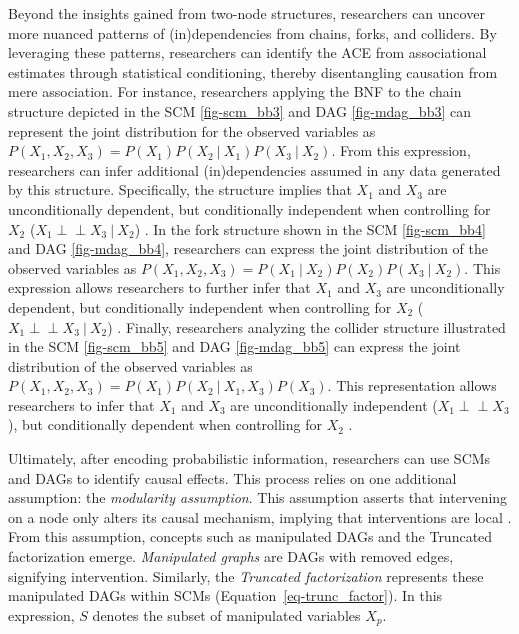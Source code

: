 \documentclass[
  authoryear,
  review,
  1p]{elsarticle}
\begin{document}
Beyond the insights gained from two-node structures, researchers can
uncover more nuanced patterns of (in)dependencies from chains, forks,
and colliders. By leveraging these patterns, researchers can identify
the ACE from associational estimates through statistical conditioning,
thereby disentangling causation from mere association. For instance,
researchers applying the BNF to the chain structure depicted in the SCM
\ref{fig-scm_bb3} and DAG \ref{fig-mdag_bb3} can represent the joint
distribution for the observed variables as
\(P(X_{1},X_{2},X_{3}) = P(X_{1}) P(X_{2} \: | \: X_{1}) P(X_{3} \: | \: X_{2})\).
From this expression, researchers can infer additional (in)dependencies
assumed in any data generated by this structure. Specifically, the
structure implies that \(X_{1}\) and \(X_{3}\) are unconditionally
dependent, but conditionally independent when controlling for \(X_{2}\)
(\(X_{1} \perp\!\!\!\perp X_{3} \: | \: X_{2}\))
\citetext{\citealp[pp.~37]{Pearl_et_al_2016}; \citealp[pp.~25]{Neal_2020}}.
In the fork structure shown in the SCM \ref{fig-scm_bb4} and DAG
\ref{fig-mdag_bb4}, researchers can express the joint distribution of
the observed variables as
\(P(X_{1},X_{2},X_{3}) = P(X_{1} \: | \: X_{2}) P(X_{2}) P(X_{3} \: | \: X_{2})\).
This expression allows researchers to further infer that \(X_{1}\) and
\(X_{3}\) are unconditionally dependent, but conditionally independent
when controlling for \(X_{2}\)
(\(X_{1} \perp\!\!\!\perp X_{3}  \: | \: X_{2}\))
\citep[pp.~40]{Pearl_et_al_2016}. Finally, researchers analyzing the
collider structure illustrated in the SCM \ref{fig-scm_bb5} and DAG
\ref{fig-mdag_bb5} can express the joint distribution of the observed
variables as
\(P(X_{1},X_{2},X_{3}) = P(X_{1}) P(X_{2} \: | \: X_{1}, X_{3}) P(X_{3})\).
This representation allows researchers to infer that \(X_{1}\) and
\(X_{3}\) are unconditionally independent
(\(X_{1} \perp\!\!\!\perp X_{3}\)), but conditionally dependent when
controlling for \(X_{2}\)
\citetext{\citealp[pp.~41]{Pearl_et_al_2016}; \citealp[pp.~26]{Neal_2020}}.

Ultimately, after encoding probabilistic information, researchers can
use SCMs and DAGs to identify causal effects. This process relies on one
additional assumption: the \emph{modularity assumption}. This assumption
asserts that intervening on a node only alters its causal mechanism,
implying that interventions are local \citep[pp.~34]{Neal_2020}. From
this assumption, concepts such as manipulated DAGs and the Truncated
factorization emerge. \emph{Manipulated graphs} are DAGs with removed
edges, signifying intervention. Similarly, the \emph{Truncated
factorization} represents these manipulated DAGs within SCMs
(Equation~\ref{eq-trunc_factor}). In this expression, \(S\) denotes the
subset of manipulated variables \(X_{p}\).
\end{document}
